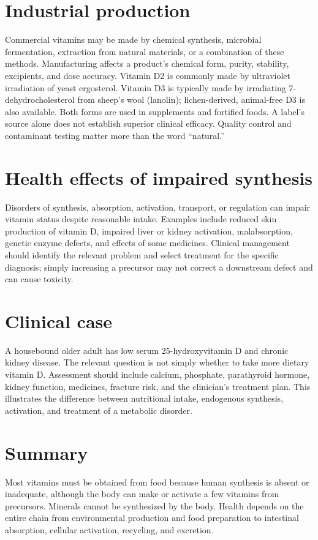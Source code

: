 \section{Industrial production}
Commercial vitamins may be made by chemical synthesis, microbial fermentation, extraction from natural materials, or a combination of these methods. Manufacturing affects a product's chemical form, purity, stability, excipients, and dose accuracy. Vitamin D2 is commonly made by ultraviolet irradiation of yeast ergosterol. Vitamin D3 is typically made by irradiating 7-dehydrocholesterol from sheep's wool (lanolin); lichen-derived, animal-free D3 is also available. Both forms are used in supplements and fortified foods. A label's source alone does not establish superior clinical efficacy. Quality control and contaminant testing matter more than the word ``natural.'' \cite{odsD}

\section{Health effects of impaired synthesis}
Disorders of synthesis, absorption, activation, transport, or regulation can impair vitamin status despite reasonable intake. Examples include reduced skin production of vitamin D, impaired liver or kidney activation, malabsorption, genetic enzyme defects, and effects of some medicines. Clinical management should identify the relevant problem and select treatment for the specific diagnosis; simply increasing a precursor may not correct a downstream defect and can cause toxicity. \cite{odsD,vitaminDMetabolism,odsSafety}

\section{Clinical case}
A housebound older adult has low serum 25-hydroxyvitamin D and chronic kidney disease. The relevant question is not simply whether to take more dietary vitamin D. Assessment should include calcium, phosphate, parathyroid hormone, kidney function, medicines, fracture risk, and the clinician's treatment plan. This illustrates the difference between nutritional intake, endogenous synthesis, activation, and treatment of a metabolic disorder. \cite{odsD,vitaminDMetabolism}

\section{Summary}
Most vitamins must be obtained from food because human synthesis is absent or inadequate, although the body can make or activate a few vitamins from precursors. Minerals cannot be synthesized by the body. Health depends on the entire chain from environmental production and food preparation to intestinal absorption, cellular activation, recycling, and excretion.
